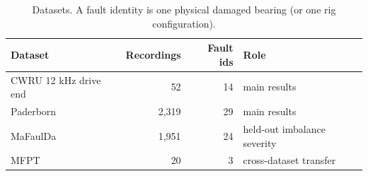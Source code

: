 \begin{table}[t]
\caption{Datasets. A fault identity is one physical damaged bearing (or one rig configuration).}
\label{tab:data}
\centering
\setlength{\tabcolsep}{3pt}
\begin{tabular}{lrrl}
\hline
Dataset & Recordings & Fault ids & Role \\
\hline
CWRU 12 kHz drive end & 52 & 14 & main results \\
Paderborn & 2,319 & 29 & main results \\
MaFaulDa & 1,951 & 24 & held-out imbalance severity \\
MFPT & 20 & 3 & cross-dataset transfer \\
\hline
\end{tabular}
\end{table}
